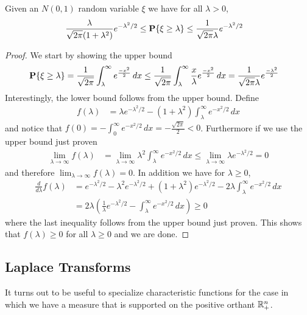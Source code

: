 \begin{lem}\label{GaussianTailsElementary}Given an $N(0,1)$ random
  variable $\xi$ we have for all $\lambda > 0$, 
\begin{align*}
\frac{\lambda}{\sqrt{2\pi}(1+\lambda^2)} e^{-\lambda^2/2}&\leq \textbf{P}\{\xi \geq
    \lambda\} \leq \frac{1}{\sqrt{2\pi} \lambda} e^{-\lambda^2/2}
\end{align*}
\end{lem}
\begin{proof}
We start by showing the upper bound 
\begin{align*}
\textbf{P}\{\xi \geq \lambda\} &= \frac{1}{\sqrt{2\pi}} \int_\lambda^\infty
e^{\frac{-x^2}{2}} \, dx 
\leq  \frac{1}{\sqrt{2\pi}} \int_\lambda^\infty
\frac{x}{\lambda} e^{\frac{-x^2}{2}} \, dx 
= \frac{1}{\sqrt{2\pi}\lambda} e^{\frac{-\lambda^2}{2}}
\end{align*}
Interestingly, the lower bound follows from the upper bound.  Define 
\begin{align*}
f(\lambda) &= \lambda e^{-\lambda^2/2} - (1 + \lambda^2)
\int_\lambda^\infty e^{-x^2/2} \, dx
\end{align*}
and notice that $f(0) = -\int_0^\infty e^{-x^2/2} \, dx =
-\frac{\sqrt{2\pi}}{2} < 0$.  Furthermore if we use the upper bound
just proven
\begin{align*}
\lim_{\lambda \to \infty} f(\lambda)
&= \lim_{\lambda \to \infty} \lambda^2 \int_\lambda^\infty e^{-x^2/2}
\, dx \leq \lim_{\lambda \to \infty} \lambda e^{-\lambda^2/2} = 0
\end{align*}
and therefore $\lim_{\lambda \to \infty} f(\lambda) = 0$.  In addition
we have for $\lambda \geq 0$,
\begin{align*}
\frac{d}{d\lambda} f(\lambda) &= e^{-\lambda^2/2} - \lambda^2
e^{-\lambda^2/2} + (1+\lambda^2) e^{-\lambda^2/2} -2\lambda
\int_\lambda^\infty e^{-x^2/2} \, dx \\
&=2\lambda \left(\frac{1}{\lambda}e^{-\lambda^2/2} -
  \int_\lambda^\infty e^{-x^2/2} \, dx \right ) \geq 0
\end{align*}
where the last inequality follows from the upper bound just proven.
This shows that $f(\lambda) \geq 0$ for all $\lambda \geq 0$ and we
are done.
\end{proof}

\subsection{Laplace Transforms}
It turns out to be useful to specialize characteristic functions for
the case in which we have a measure that is supported on the positive
orthant $\mathbb{R}^n_+$.  


